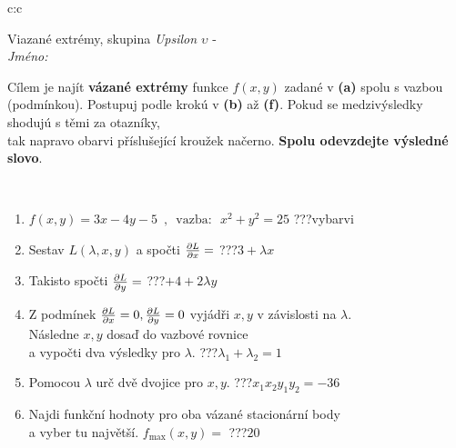 \documentclass[10pt]{report}
\begin{document}
\begin{tabular}{c:c}
\begin{minipage}[c][104.5mm][t]{0.5\linewidth}
\begin{center}
\vspace{7mm}
{\huge Viazané extrémy, skupina \textit{Upsilon $\upsilon$} -}\\[5mm]
\textit{Jméno:}\phantom{xxxxxxxxxxxxxxxxxxxxxxxxxxxxxxxxxxxxxxxxxxxxxxxxxxxxxxxxxxxxxxxxx}\\[5mm]
\begin{minipage}{0.95\linewidth}
\begin{center}
Cílem je najít \textbf{vázané extrémy} funkce $f(x,y)$ zadané v \textbf{(a)} spolu s vazbou (podmínkou). Postupuj podle krokú v \textbf{(b)} až \textbf{(f)}. Pokud se medzivýsledky shodujú s těmi za otazníky,\\tak napravo obarvi příslušející kroužek načerno. \textbf{Spolu odevzdejte výsledné slovo}.
\end{center}
\end{minipage}
\\[1mm]
\begin{minipage}{0.79\linewidth}
\begin{center}
\begin{varwidth}{\linewidth}
\begin{enumerate}
\normalsize
\item $f(x,y)=3x-4y-5 \enspace , \enspace \mathrm{vazba:} \enspace x^2+y^2=25$\quad \dotfill\; ???\;\dotfill \quad vybarvi
\item Sestav $L(\lambda,x,y)$ a spočti $\pdv{L}{x}=$\quad \dotfill\; ???\;\dotfill \quad $3+\lambda x$
\item Takisto spočti $\pdv{L}{y}=$\quad \dotfill\; ???\;\dotfill \quad $+4+2\lambda y$
\item Z podmínek $\pdv{L}{x}=0 , \pdv{L}{y}=0$ vyjádři $x,y$ v závislosti na $\lambda$.\\ \phantom{xxxxxx}Následne $x,y$ dosaď do vazbové rovnice\\ \phantom{xxxxxx}a vypočti dva výsledky pro $\lambda$.\quad \dotfill\; ???\;\dotfill \quad $\lambda_1+\lambda_2=1$
\item Pomocou $\lambda$ urč dvě dvojice pro $x,y$.\quad \dotfill\; ???\;\dotfill \quad $x_1 x_2 y_1 y_2=-36$
\item Najdi funkční hodnoty pro oba vázané stacionární body\\ \phantom{xxxxxx}a vyber tu najvětší. $f_{\text{max}}(x,y)=$\quad \dotfill\; ???\;\dotfill \quad $20$

\end{enumerate}
\end{varwidth}
\end{center}
\end{minipage}
\end{center}
\end{minipage}
\end{tabular}
\end{document}
